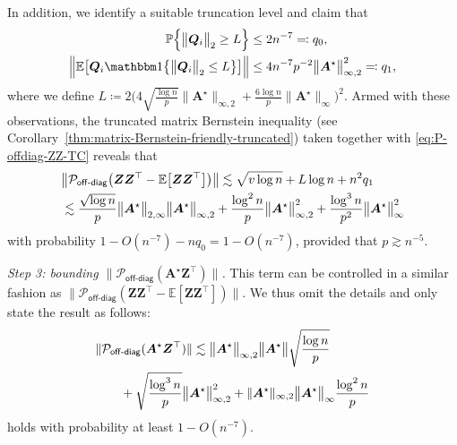 %
In addition, we identify a suitable truncation level and claim that
%
\begin{subequations}
	\label{eq:Qi-tail-bound-exp-bound-TC}
\begin{align}
\mathbb{P}\Big\{\big\|\bm{Q}_{i}\big\|_{2}\geq L\Big\} & \leq2n^{-7}\eqqcolon q_{0},\\
\Big\|\mathbb{E}\big[\bm{Q}_{i}\mathbbm1\big\{\big\|\bm{Q}_{i}\big\|_{2}\leq L\big\}\big]\Big\| & \leq4n^{-7}p^{-2}\big\|\bm{A}^{\star}\big\|_{\infty,2}^{2}\eqqcolon q_{1},	
\end{align}
\end{subequations}
%
where we define $L \coloneqq 2\big(4\sqrt{\frac{\log n}{p}}\big\|\bm{A}^{\star}\big\|_{\infty,2}+\frac{6\log n}{p}\big\|\bm{A}^{\star}\big\|_{\infty}\big)^2$.
Armed with these observations, the truncated matrix Bernstein inequality (see Corollary~\ref{thm:matrix-Bernstein-friendly-truncated}) taken together with \eqref{eq:P-offdiag-ZZ-TC} reveals that
%
\begin{align}
 & \big\|\mathcal{P}_{\mathsf{off}\text{-}\mathsf{diag}}\big(\bm{Z}\bm{Z}^{\top}-\mathbb{E}\big[\bm{Z}\bm{Z}^{\top}\big]\big)\big\|
   \lesssim\sqrt{v\log n}+L\log n+n^{2}q_{1} \notag\\
 &  \lesssim\frac{\sqrt{\log n}}{p}\big\|\bm{A}^{\star}\big\|_{2,\infty}\big\|\bm{A}^{\star}\big\|_{\infty,2}+ \frac{\log^{2}n}{p} \big\|\bm{A}^{\star}\big\|_{\infty,2}^{2}+\frac{\log^{3}n}{p^{2}}\big\|\bm{A}^{\star}\big\|_{\infty}^{2}
	\label{eq:P-off-diag-ZZt-intermediate-TC}
\end{align}
%
with probability  $1- O(n^{-7}) - nq_0=1- O(n^{-7})$, provided that $p\gtrsim n^{-5}$.





\bigskip\noindent
{\em Step 3: bounding $\|\mathcal{P}_{\mathsf{off}\text{-}\mathsf{diag}}(\bm{A}^{\star}\bm{Z}^{\top})\|$.} This term can be controlled in a similar fashion as $\|\mathcal{P}_{\mathsf{off}\text{-}\mathsf{diag}} (\bm{Z}\bm{Z}^{\top} -\mathbb{E}[\bm{Z}\bm{Z}^{\top} ] ) \|$.  We thus omit the details and only state the result as follows:
%
\begin{align}
	& \|\mathcal{P}_{\mathsf{off}\text{-}\mathsf{diag}}(\bm{A}^{\star}\bm{Z}^{\top})\|
	\lesssim
	\big\|\bm{A}^{\star}\big\|_{\infty,2}\big\|\bm{A}^{\star}\big\|\sqrt{\frac{\log n}{p}} \notag\\
	& \qquad
	+\sqrt{\frac{\log^{3}n}{p}}\big\|\bm{A}^{\star}\big\|_{\infty,2}^{2} + \|\bm{A}^{\star}\|_{\infty,2}\big\|\bm{A}^{\star}\big\|_{\infty}\frac{\log^{2}n}{p}
	\label{eq:P-offdiag-AZ-intermediate-TC}
\end{align}
%
holds with probability at least $1-O(n^{-7})$.



